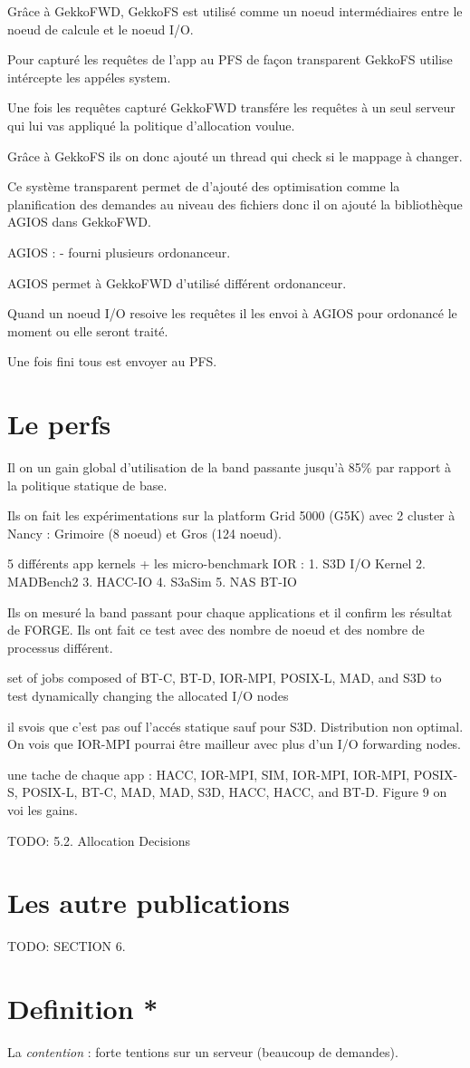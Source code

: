\documentclass[10pt, a4paper]{article}
\begin{document}
Grâce à GekkoFWD, GekkoFS est utilisé comme un noeud intermédiaires entre le noeud de calcule et le noeud I/O.

Pour capturé les requêtes de l'app au PFS de façon transparent GekkoFS utilise intércepte les appéles system.

Une fois les requêtes capturé GekkoFWD transfére les requêtes à un seul serveur qui lui vas appliqué la politique d'allocation voulue.

Grâce à GekkoFS ils on donc ajouté un thread qui check si le mappage à changer.

Ce système transparent permet de d'ajouté des optimisation comme la planification des demandes au niveau des fichiers donc il on ajouté la bibliothèque AGIOS dans GekkoFWD.

AGIOS :
- fourni plusieurs ordonanceur.

AGIOS permet à GekkoFWD d'utilisé différent ordonanceur.

Quand un noeud I/O resoive les requêtes il les envoi à AGIOS pour ordonancé le moment ou elle seront traité.

Une fois fini tous est envoyer au PFS.

\section{Le perfs}

Il on un gain global d'utilisation de la band passante jusqu'à 85\% par rapport à la politique statique de base.


Ils on fait les expérimentations sur la platform Grid 5000 (G5K) avec 2 cluster à Nancy : Grimoire (8 noeud) et Gros (124 noeud). %

5 différents app kernels + les micro-benchmark IOR :
1. S3D I/O Kernel
2. MADBench2
3. HACC-IO
4. S3aSim
5. NAS BT-IO

Ils on mesuré la band passant pour chaque applications et il confirm les résultat de FORGE. Ils ont fait ce test avec des nombre de noeud et des nombre de processus différent.

set of jobs composed of BT-C, BT-D, IOR-MPI, POSIX-L, MAD, and S3D to test dynamically changing the allocated I/O nodes

il svois que c'est pas ouf l'accés statique sauf pour S3D. Distribution non optimal. On vois que IOR-MPI pourrai être mailleur avec plus d'un I/O forwarding nodes.

une tache de chaque app : HACC, IOR-MPI, SIM, IOR-MPI, IOR-MPI, POSIX-S, POSIX-L, BT-C, MAD, MAD, S3D, HACC, HACC, and BT-D. Figure 9 on voi les gains.



TODO: 5.2. Allocation Decisions


\section{Les autre publications}

TODO: SECTION 6.

\section{Definition *}

La \emph{contention} : forte tentions sur un serveur (beaucoup de demandes).
\end{document}
